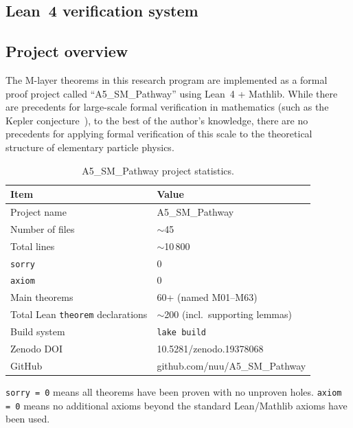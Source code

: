 \documentclass[sn-mathphys-num,Numbered]{sn-jnl}
\theoremstyle{thmstyleone}
\theoremstyle{thmstylethree}
\begin{document}
\begin{appendices}

\section{Lean~4 verification system}\label{app:lean}

\subsection{Project overview}

The M-layer theorems in this research program are implemented as a formal proof
project called ``A5\_SM\_Pathway'' using Lean~4 + Mathlib.  While there are
precedents for large-scale formal verification in mathematics (such as the
Kepler conjecture~\cite{Hales2017}), to the best of the author's knowledge,
there are no precedents for applying formal verification of this scale to the
theoretical structure of elementary particle physics.

\begin{table}[htb]
\centering
\caption{A5\_SM\_Pathway project statistics.}\label{tab:project-stats}
\begin{tabular}{ll}
\toprule
Item & Value \\
\midrule
Project name & A5\_SM\_Pathway \\
Number of files & $\sim$45 \\
Total lines & $\sim$10\,800 \\
\texttt{sorry} & 0 \\
\texttt{axiom} & 0 \\
Main theorems & 60+ (named M01--M63) \\
Total Lean \texttt{theorem} declarations & $\sim$200 (incl.\ supporting lemmas) \\
Build system & \texttt{lake build} \\
Zenodo DOI & 10.5281/zenodo.19378068 \\
GitHub & github.com/nuu/A5\_SM\_Pathway \\
\bottomrule
\end{tabular}
\end{table}

\texttt{sorry\,=\,0} means all theorems have been proven with no unproven
holes.  \texttt{axiom\,=\,0} means no additional axioms beyond the standard
Lean/Mathlib axioms have been used.



\end{appendices}
\end{document}
